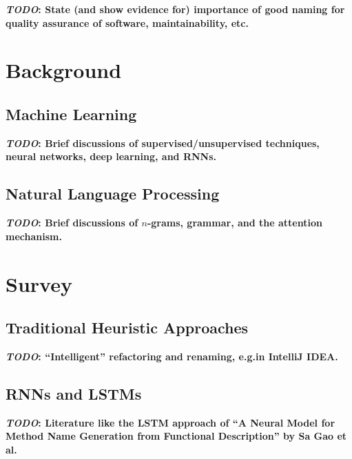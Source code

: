 \documentclass[conference]{IEEEtran}
\newcommand{\TODO}[1]{\textbf{\textcolor{Bittersweet}{#1}}\xspace}
\newcommand{\TODOM}[1]{\TODO{\emph{TODO}: #1}\xspace}
\begin{document}
\TODOM{State (and show evidence for) importance of good naming for quality assurance of
software, maintainability, etc.}


\section{Background}
\label{sec:Background}

\subsection{Machine Learning}
\label{ssec:Machine-Learning}

\TODOM{Brief discussions of supervised/unsupervised techniques, neural networks, deep
learning, and RNNs.}


\subsection{Natural Language Processing}
\label{ssec:Natural-Language-Processing}

\TODOM{Brief discussions of $n$-grams, grammar, and the attention mechanism.}


\section{Survey}
\label{sec:Survey}

\subsection{Traditional Heuristic Approaches}
\label{ssec:Traditional-Heuristic-Approaches}
\TODOM{``Intelligent'' refactoring and renaming, e.g.\@ in IntelliJ IDEA.}

\subsection{RNNs and LSTMs}
\label{ssec:RNNs and LSTMs}
\TODOM{Literature like the LSTM approach of ``A Neural Model for Method Name Generation
from Functional Description'' by Sa Gao et al.\cite{Gao2019IdentGen}}
\end{document}
